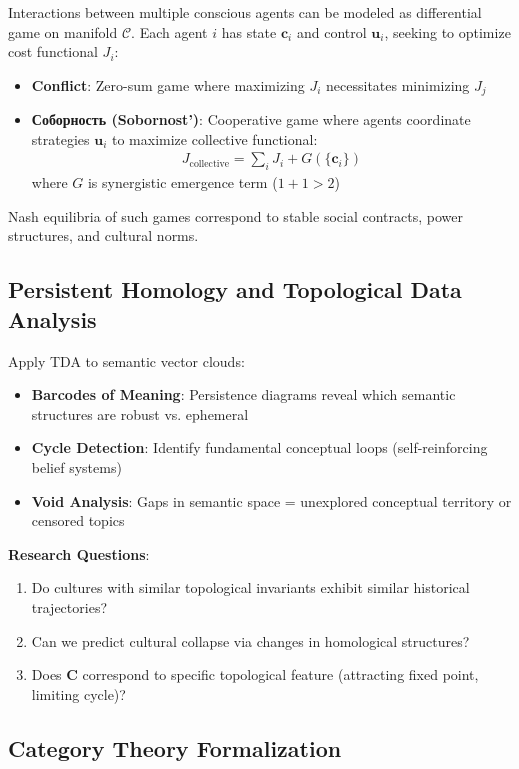 \documentclass[11pt,a4paper]{article}
\theoremstyle{definition}
\theoremstyle{remark}
\newcommand{\CC}{\mathcal{C}}
\newcommand{\cc}{\mathbf{c}}
\begin{document}
Interactions between multiple conscious agents can be modeled as differential game on manifold \(\CC\). Each agent \(i\) has state \(\cc_i\) and control \(\mathbf{u}_i\), seeking to optimize cost functional \(J_i\):

\begin{itemize}
    \item \textbf{Conflict}: Zero-sum game where maximizing \(J_i\) necessitates minimizing \(J_j\)
    \item \textbf{Соборность (Sobornost')}: Cooperative game where agents coordinate strategies \(\mathbf{u}_i\) to maximize collective functional:
    \begin{align}
    J_{\text{collective}} = \sum_i J_i + G(\{\cc_i\})
    \end{align}
    where \(G\) is synergistic emergence term (\(1+1>2\))
\end{itemize}

Nash equilibria of such games correspond to stable social contracts, power structures, and cultural norms.

\subsection{Persistent Homology and Topological Data Analysis}

Apply TDA to semantic vector clouds:
\begin{itemize}
\item \textbf{Barcodes of Meaning}: Persistence diagrams reveal which semantic structures are robust vs. ephemeral
\item \textbf{Cycle Detection}: Identify fundamental conceptual loops (self-reinforcing belief systems)
\item \textbf{Void Analysis}: Gaps in semantic space = unexplored conceptual territory or censored topics
\end{itemize}

\textbf{Research Questions}:
\begin{enumerate}
\item Do cultures with similar topological invariants exhibit similar historical trajectories?
\item Can we predict cultural collapse via changes in homological structures?
\item Does \(\mathbf{C}\) correspond to specific topological feature (attracting fixed point, limiting cycle)?
\end{enumerate}

\subsection{Category Theory Formalization}
\end{document}
